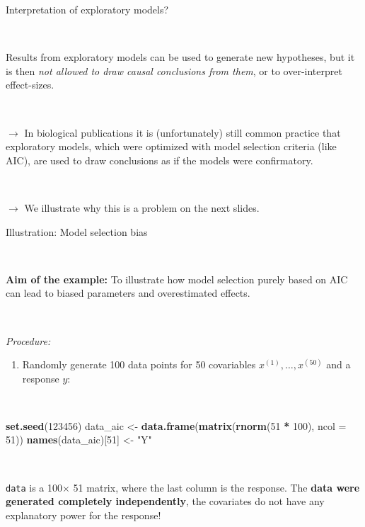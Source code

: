 \documentclass[10pt,ignorenonframetext,]{beamer}
\newenvironment{Shaded}{\begin{snugshade}}{\end{snugshade}}
\newcommand{\DataTypeTok}[1]{\textcolor[rgb]{0.13,0.29,0.53}{#1}}
\newcommand{\DecValTok}[1]{\textcolor[rgb]{0.00,0.00,0.81}{#1}}
\newcommand{\KeywordTok}[1]{\textcolor[rgb]{0.13,0.29,0.53}{\textbf{#1}}}
\newcommand{\NormalTok}[1]{#1}
\newcommand{\OperatorTok}[1]{\textcolor[rgb]{0.81,0.36,0.00}{\textbf{#1}}}
\newcommand{\StringTok}[1]{\textcolor[rgb]{0.31,0.60,0.02}{#1}}
\providecommand{\tightlist}{%
  \setlength{\itemsep}{0pt}\setlength{\parskip}{0pt}}
\begin{document}
\begin{frame}

\begin{block}{Interpretation of exploratory models?}

\(~\)

Results from exploratory models can be used to generate new hypotheses,
but it is then \emph{not allowed to draw causal conclusions from them},
or to over-interpret effect-sizes.

\(~\)

\(\rightarrow\) In biological publications it is (unfortunately) still
common practice that exploratory models, which were optimized with model
selection criteria (like AIC), are used to draw conclusions as if the
models were confirmatory.

\(~\)

\(\rightarrow\) We illustrate why this is a problem on the next slides.

\end{block}

\end{frame}

\begin{frame}[fragile]

\begin{block}{Illustration: Model selection bias}

\(~\)

\textbf{Aim of the example:} To illustrate how model selection purely
based on AIC can lead to biased parameters and overestimated effects.

\(~\)

\emph{Procedure:} \vspace{2mm}

\begin{enumerate}
\tightlist
\item
  Randomly generate 100 data points for 50 covariables
  \(x^{(1)},\ldots, x^{(50)}\) and a response \(y\):
\end{enumerate}

\(~\) \scriptsize

\begin{Shaded}
\begin{Highlighting}[]
\KeywordTok{set.seed}\NormalTok{(}\DecValTok{123456}\NormalTok{)}
\NormalTok{data_aic <-}\StringTok{ }\KeywordTok{data.frame}\NormalTok{(}\KeywordTok{matrix}\NormalTok{(}\KeywordTok{rnorm}\NormalTok{(}\DecValTok{51} \OperatorTok{*}\StringTok{ }\DecValTok{100}\NormalTok{), }\DataTypeTok{ncol =} \DecValTok{51}\NormalTok{))}
\KeywordTok{names}\NormalTok{(data_aic)[}\DecValTok{51}\NormalTok{] <-}\StringTok{ "Y"}
\end{Highlighting}
\end{Shaded}

\(~\)

\normalsize

\texttt{data} is a 100\(\times\) 51 matrix, where the last column is the
response. The \textbf{data were generated completely independently}, the
covariates do not have any explanatory power for the response!

\end{block}

\end{frame}
\end{document}
